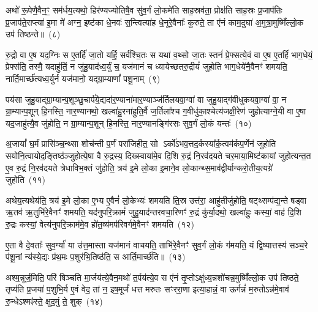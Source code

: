 अथो॑ रू॒पेणै॒वैन॒ꣳ॒ सम॑र्धय॒त्यथो॒ हिर॑ण्यज्योतिषै॒व सु॑व॒र्गं लो॒कमे॑ति साह॒स्रव॑ता॒ प्रोक्ष॑ति साह॒स्रः प्र॒जा\-प॑तिः प्र॒जा\-प॑ते॒राप्त्या॑ इ॒मा मे॑ अग्न॒ इष्ट॑का धे॒नवः॑ स॒न्त्वित्या॑ह धे॒नूरे॒वैनाः᳚ कुरुते॒ ता ए॑नं काम॒दुघा॑ अ॒मुत्रा॒मुष्मिँ॑ल्लो॒क उप॑ तिष्ठन्ते॥~(८)

{\anuvakamend[{सयो॑निमे॒ता वै क॑रो॒त्येका॒न्नच॑त्वारि॒ꣳ॒शच्च॑}]}%

रु॒द्रो वा ए॒ष यद॒ग्निः स ए॒तर्\mbox{}हि॑ जा॒तो यर्\mbox{}हि॒ सर्व॑श्चि॒तः स यथा॑ व॒थ्सो जा॒तः स्तनं॑ प्रे॒फ्सत्ये॒वं वा ए॒ष ए॒तर्\mbox{}हि॑ भाग॒धेयं॒ प्रेफ्स॑ति॒ तस्मै॒ यदाहु॑तिं॒ न जु॑हु॒याद॑ध्व॒र्युं च॒ यज॑मानं च ध्यायेच्छतरु॒द्रीयं॑ जुहोति भाग॒धेये॑नै॒वैनꣳ॑ शमयति॒ नार्ति॒मार्च्छ॑त्यध्व॒र्युर्न यज॑मानो॒ यद्ग्रा॒म्याणां᳚ पशू॒नाम्~(९)

पय॑सा जुहु॒याद्ग्रा॒म्यान्प॒शूञ्छु॒चार्प॑ये॒द्यदा॑र॒ण्याना॑मार॒ण्याञ्ज॑र्तिलयवा॒ग्वा॑ वा जुहु॒याद्ग॑वीधुकयवा॒ग्वा॑ वा॒ न ग्रा॒म्यान्प॒शून् हि॒नस्ति॒ नार॒ण्यानथो॒ खल्वा॑हु॒रना॑हुति॒र्वै ज॒र्तिला᳚श्च ग॒वीधु॑का॒श्चेत्य॑जक्षी॒रेण॑ जुहोत्याग्ने॒यी वा ए॒षा यद॒जाहु॑त्यै॒व जु॑होति॒ न ग्रा॒म्यान्प॒शून् हि॒नस्ति॒ नार॒ण्यानङ्गि॑रसः सुव॒र्गं लो॒कं यन्तः॑~(१०)

अ॒जायां᳚ घ॒र्मं प्रासि॑ञ्च॒न्थ्सा शोच॑न्ती प॒र्णं परा॑जिहीत॒ सो \-ऽर्को॑\-ऽभव॒त्तद॒र्कस्या᳚र्क॒त्वम॑र्कप॒र्णेन॑ जुहोति सयोनि॒त्वायोद॒ङ्तिष्ठ॑ञ्जुहोत्ये॒षा वै रु॒द्रस्य॒ दिख्स्वाया॑मे॒व दि॒शि रु॒द्रं नि॒रव॑दयते चर॒माया॒मिष्ट॑कायां जुहोत्यन्त॒त ए॒व रु॒द्रं नि॒रव॑दयते त्रेधाविभ॒क्तं जु॑होति॒ त्रय॑ इ॒मे लो॒का इ॒माने॒व लो॒कान्थ्स॒माव॑द्वीर्यान्करो॒तीय॒त्यग्रे॑ जुहोति~(११)

अथेय॒त्यथेय॑ति॒ त्रय॑ इ॒मे लो॒का ए॒भ्य ए॒वैनं॑ लो॒केभ्यः॑ शमयति ति॒स्र उत्त॑रा॒ आहु॑तीर्जुहोति॒ षट्थ्सम्प॑द्य॒न्ते षड्वा ऋ॒तव॑ ऋ॒तुभि॑रे॒वैनꣳ॑ शमयति॒ यद॑नुपरि॒क्रामं॑ जुहु॒याद॑न्तरवचा॒रिणꣳ॑ रु॒द्रं कु॑र्या॒दथो॒ खल्वा॑हुः॒ कस्यां॒ वाह॑ दि॒शि रु॒द्रः कस्यां॒ वेत्य॑नुपरि॒क्राम॑मे॒व हो॑त॒व्य॑मप॑रिवर्गमे॒वैनꣳ॑ शमयति~(१२)

ए॒ता वै दे॒वताः᳚ सुव॒र्ग्या॑ या उ॑त्त॒मास्ता यज॑मानं वाचयति॒ ताभि॑रे॒वैनꣳ॑ सुव॒र्गं लो॒कं ग॑मयति॒ यं द्वि॒ष्यात्तस्य॑ सञ्च॒रे प॑शू॒नां न्य॑स्ये॒द्यः प्र॑थ॒मः प॒शुर॑भि॒तिष्ठ॑ति॒ स आर्ति॒मार्च्छ॑ति॥~(१३)

{\anuvakamend[{प॒शू॒नां यन्तो\-ऽग्रे॑ जुहो॒त्यप॑रिवर्गमे॒वैनꣳ॑ शमयति त्रि॒ꣳ॒शच्च॑}]}%

अश्म॒न्नूर्ज॒मिति॒ परि॑ षिञ्चति मा॒र्जय॑त्ये॒वैन॒मथो॑ त॒र्पय॑त्ये॒व स ए॑नं तृ॒प्तो\-ऽक्षु॑ध्य॒न्नशो॑चन्न॒मुष्मिँ॑ल्लो॒क उप॑ तिष्ठते॒ तृप्य॑ति प्र॒जया॑ प॒शुभि॒र्य ए॒वं वेद॒ तां न॒ इष॒मूर्जं॑ धत्त मरुतः सꣳररा॒णा इत्या॒हान्नं॒ वा ऊर्गन्नं॑ म॒रुतो\-ऽन्न॑मे॒वाव॑ रु॒न्धे\-ऽश्मꣴ॑स्ते॒ क्षुद॒मुं ते॒ शुक्~(१४)

